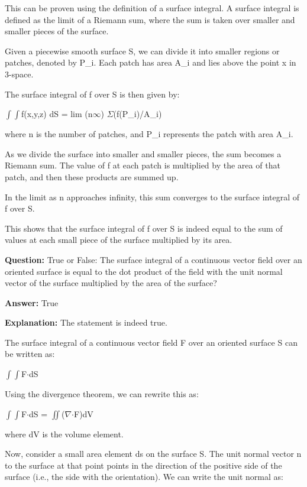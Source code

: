 \documentclass{article}
\begin{document}
This can be proven using the definition of a surface integral. A surface integral is defined as the limit of a Riemann sum, where the sum is taken over smaller and smaller pieces of the surface. 

Given a piecewise smooth surface S, we can divide it into smaller regions or patches, denoted by P\_i. Each patch has area A\_i and lies above the point x in 3-space.

The surface integral of f over S is then given by:

\ensuremath{\int}\ensuremath{\int}f(x,y,z) dS = lim (n{\textrightarrow}\ensuremath{\infty}) \ensuremath{\Sigma}(f(P\_i)/A\_i)

where n is the number of patches, and P\_i represents the patch with area A\_i.

As we divide the surface into smaller and smaller pieces, the sum becomes a Riemann sum. The value of f at each patch is multiplied by the area of that patch, and then these products are summed up.

In the limit as n approaches infinity, this sum converges to the surface integral of f over S. 

This shows that the surface integral of f over S is indeed equal to the sum of values at each small piece of the surface multiplied by its area.
                
                \vspace{0.5cm} 
        
            
                \textbf {Question:} True or False: The surface integral of a continuous vector field over an oriented surface is equal to the dot product of the field with the unit normal vector of the surface multiplied by the area of the surface?
                
                \textbf{Answer:} True

                \textbf{Explanation:} The statement is indeed true.

The surface integral of a continuous vector field F over an oriented surface S can be written as:

\ensuremath{\int}\ensuremath{\int}F\ensuremath{\cdot}dS

Using the divergence theorem, we can rewrite this as:

\ensuremath{\int}\ensuremath{\int}F\ensuremath{\cdot}dS = \ensuremath{\iint}(\ensuremath{\nabla}\ensuremath{\cdot}F)dV

where dV is the volume element.

Now, consider a small area element ds on the surface S. The unit normal vector n to the surface at that point points in the direction of the positive side of the surface (i.e., the side with the orientation). We can write the unit normal as:
\end{document}
